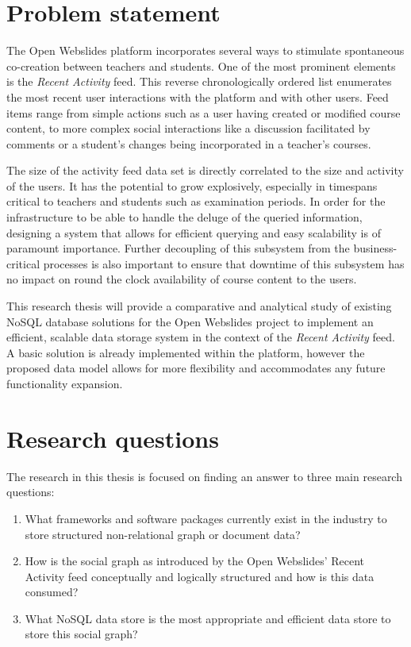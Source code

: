 \section{Problem statement}
\label{sec:problem-statement}

The Open Webslides platform incorporates several ways to stimulate spontaneous co-creation between teachers and students.
One of the most prominent elements is the \textit{Recent Activity} feed.
This reverse chronologically ordered list enumerates the most recent user interactions with the platform and with other users.
Feed items range from simple actions such as a user having created or modified course content, to more complex social interactions like a discussion facilitated by comments or a student's changes being incorporated in a teacher's courses.

The size of the activity feed data set is directly correlated to the size and activity of the users.
It has the potential to grow explosively, especially in timespans critical to teachers and students such as examination periods.
In order for the infrastructure to be able to handle the deluge of the queried information, designing a system that allows for efficient querying and easy scalability is of paramount importance.
Further decoupling of this subsystem from the business-critical processes is also important to ensure that downtime of this subsystem has no impact on round the clock availability of course content to the users.

This research thesis will provide a comparative and analytical study of existing NoSQL database solutions for the Open Webslides project to implement an efficient, scalable data storage system in the context of the \textit{Recent Activity} feed.
A basic solution is already implemented within the platform, however the proposed data model allows for more flexibility and accommodates any future functionality expansion.

\section{Research questions}
\label{sec:research-questions}

The research in this thesis is focused on finding an answer to three main research questions:

\begin{enumerate}
  \item What frameworks and software packages currently exist in the industry to store structured non-relational graph or document data?
  \item How is the social graph as introduced by the Open Webslides' Recent Activity feed conceptually and logically structured and how is this data consumed?
  \item What NoSQL data store is the most appropriate and efficient data store to store this social graph?
\end{enumerate}

